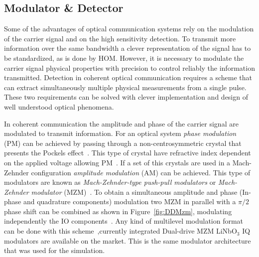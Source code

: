 \subsection{Modulator \& Detector}\label{sec:moddet}
Some of the advantages of optical communication systems rely on the modulation of the carrier signal and on the high sensitivity detection. To transmit more information over the same bandwidth a clever representation of the signal has to be standardized, as is done by HOM. However, it is necessary to modulate the carrier signal physical properties with precision to control reliably the information transmitted. Detection in coherent optical communication requires a scheme that can extract simultaneously multiple physical measurements from a single pulse. These two requirements can be solved with clever implementation and design of well understood optical phenomena.

In coherent communication the amplitude and phase of the carrier signal are modulated to transmit information. For an optical system \textit{phase modulation} (PM) can be achieved by passing through a non-centrosymmetric crystal that presents the Pockels effect~\cite{FiberAgrawal,kikuchi2015fundamentals}. This type of crystal have refractive index dependent on the applied voltage allowing PM~\cite{kikuchi2015fundamentals}. If a set of this crystals are used in a Mach-Zehnder configuration \textit{amplitude modulation} (AM) can be achieved.  This type of modulators are known as \textit{Mach-Zehnder-type push-pull modulators} or \textit{Mach-Zehnder modulator} (MZM)~\cite{kikuchi2015fundamentals}. To obtain a simultaneous amplitude and phase (In-phase and quadrature components)  modulation two MZM in parallel with a $\pi/2$ phase shift can be combined as shown in Figure~\ref{fig:DDMzm}, modulating independently the IO  components~\cite{kikuchi2015fundamentals}. Any kind of multilevel modulation format can be done with this scheme~\cite{ho2005generation},currently  integrated Dual-drive MZM LiNbO$_3$ IQ modulators are available on the market. This is the same modulator architecture that was used for the simulation.   


